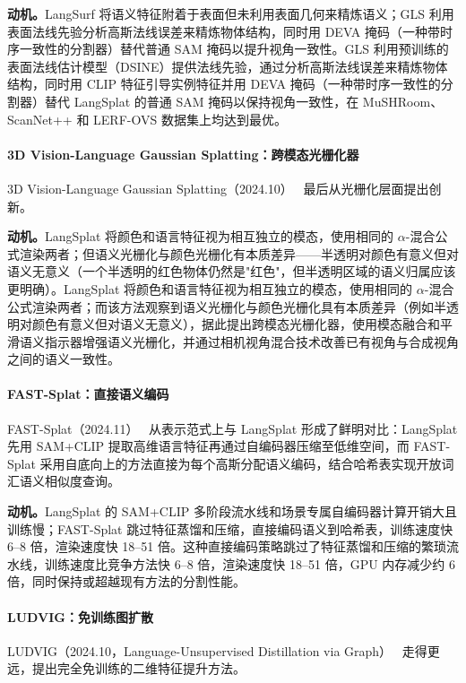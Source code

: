 \textbf{动机。}LangSurf 将语义特征附着于表面但未利用表面几何来精炼语义；GLS 利用表面法线先验分析高斯法线误差来精炼物体结构，同时用 DEVA 掩码（一种带时序一致性的分割器）替代普通 SAM 掩码以提升视角一致性。GLS 利用预训练的表面法线估计模型（DSINE）提供法线先验，通过分析高斯法线误差来精炼物体结构，同时用 CLIP 特征引导实例特征并用 DEVA 掩码（一种带时序一致性的分割器）替代 LangSplat 的普通 SAM 掩码以保持视角一致性，在 MuSHRoom、ScanNet++ 和 LERF-OVS 数据集上均达到最优。

\paragraph{3D Vision-Language Gaussian Splatting：跨模态光栅化器} 3D Vision-Language Gaussian Splatting（2024.10）~\cite{2410_07577} 最后从光栅化层面提出创新。

\textbf{动机。}LangSplat 将颜色和语言特征视为相互独立的模态，使用相同的 $\alpha$-混合公式渲染两者；但语义光栅化与颜色光栅化有本质差异——半透明对颜色有意义但对语义无意义（一个半透明的红色物体仍然是"红色"，但半透明区域的语义归属应该更明确）。LangSplat 将颜色和语言特征视为相互独立的模态，使用相同的 $\alpha$-混合 公式渲染两者；而该方法观察到语义光栅化与颜色光栅化具有本质差异（例如半透明对颜色有意义但对语义无意义），据此提出跨模态光栅化器，使用模态融合和平滑语义指示器增强语义光栅化，并通过相机视角混合技术改善已有视角与合成视角之间的语义一致性。

\paragraph{FAST-Splat：直接语义编码} FAST-Splat（2024.11）~\cite{2411_13753} 从表示范式上与 LangSplat 形成了鲜明对比：LangSplat 先用 SAM+CLIP 提取高维语言特征再通过自编码器压缩至低维空间，而 FAST-Splat 采用自底向上的方法直接为每个高斯分配语义编码，结合哈希表实现开放词汇语义相似度查询。

\textbf{动机。}LangSplat 的 SAM+CLIP 多阶段流水线和场景专属自编码器计算开销大且训练慢；FAST-Splat 跳过特征蒸馏和压缩，直接编码语义到哈希表，训练速度快 6--8 倍，渲染速度快 18--51 倍。这种直接编码策略跳过了特征蒸馏和压缩的繁琐流水线，训练速度比竞争方法快 6--8 倍，渲染速度快 18--51 倍，GPU 内存减少约 6 倍，同时保持或超越现有方法的分割性能。

\paragraph{LUDVIG：免训练图扩散} LUDVIG（2024.10，Language-Unsupervised Distillation via Graph）~\cite{2410_14462} 走得更远，提出完全免训练的二维特征提升方法。

